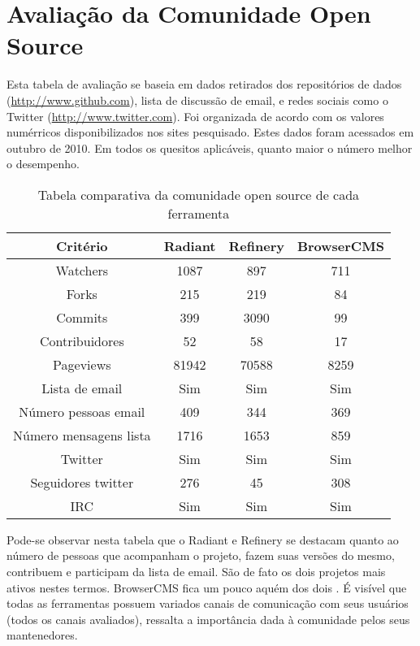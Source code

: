 \section{Avaliação da Comunidade Open Source}

Esta tabela de avaliação se baseia em dados retirados dos repositórios de dados (\url{http://www.github.com}), lista de discussão de email, e redes sociais como o Twitter (\url{http://www.twitter.com}). Foi organizada de acordo com os valores numérricos disponibilizados nos sites pesquisado. Estes dados foram acessados em outubro de 2010. Em todos os quesitos aplicáveis, quanto maior o número melhor o desempenho. 

\begin{table}[ht]
\caption{Tabela comparativa da comunidade open source de cada ferramenta } %
\centering %
\begin{tabular}{c c c c} %
\hline\hline %
Critério & Radiant & Refinery & BrowserCMS \\ [0.5ex] %
\hline %
Watchers               & 1087  & 897   & 711   \\ %
Forks                  & 215   & 219   & 84    \\
Commits                & 399   & 3090  & 99    \\
Contribuidores         & 52    & 58    & 17    \\ 
Pageviews              & 81942 & 70588 & 8259 \\ 
Lista de email         & Sim   & Sim   & Sim  \\ 
Número pessoas email   & 409   & 344   & 369  \\ 
Número mensagens lista & 1716  & 1653  & 859  \\ 
Twitter                & Sim   & Sim   & Sim  \\ 
Seguidores twitter     & 276   & 45    & 308  \\ 
IRC                    & Sim   & Sim   & Sim  \\ [1ex] %
\hline %
\end{tabular}
\label{table:nonlin} %
\end{table}

Pode-se observar nesta tabela que o Radiant e Refinery se destacam quanto ao número de pessoas que acompanham o projeto, fazem suas versões do mesmo, contribuem e participam da lista de email. São de fato os dois projetos mais ativos nestes termos. BrowserCMS fica um pouco aquém dos dois . É visível que todas as ferramentas possuem variados canais de comunicação com seus usuários (todos os canais avaliados), ressalta a importância dada à comunidade pelos seus mantenedores.

